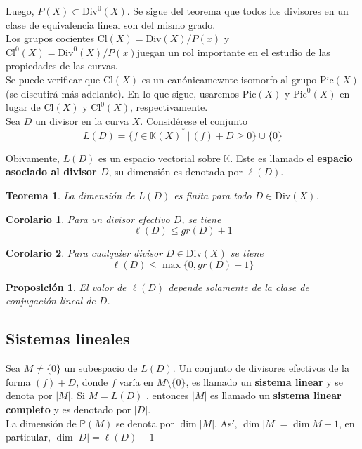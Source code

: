 \documentclass[12pt,a4paper]{report}
\newcommand{\K}{\mathbb{K}}
\newtheorem{teo}{Teorema}[chapter]
\newtheorem{cor}{Corolario}[chapter]
\newtheorem{prop}{Proposición}[chapter]
\begin{document}
Luego, $P(X) \subset \mbox{Div}^{0}(X)$. Se sigue del teorema que todos los divisores en un clase de equivalencia lineal son del mismo grado. \\
Los grupos cocientes $\mbox{Cl}(X)=\mbox{Div}(X)/P(x)$ y $\mbox{Cl}^{0}(X)=\mbox{Div}^{0}(X)/P(x) $juegan un rol importante en el estudio de las propiedades de las curvas. \\
Se puede verificar que $\mbox{Cl}(X)$ es un canónicamewnte isomorfo al grupo $\mbox{Pic}(X)$ (se discutirá más adelante). En lo que sigue, usaremos $ \mbox{Pic}(X) $ y $\mbox{Pic}^{0}(X)$ en lugar de $ \mbox{Cl}(X) $ y $\mbox{Cl}^{0}(X)$, respectivamente. \\
Sea $D$ un divisor en la curva $X$. Considérese el conjunto $$L(D)= \{ f \in \K(X)^{*} \, | \, (f) +D \geqslant 0 \} \cup \{0\} $$

Obivamente, $L(D)$ es un espacio vectorial sobre $\K$. Este es llamado el \textbf{espacio asociado al divisor $D$}, su dimensión es denotada por $ \ell (D) $.

\begin{teo}\label{2.1.53}
	La dimensión de $L(D)$ es finita para todo $D \in \mbox{Div}(X)$.
\end{teo}

\begin{cor}
	Para un divisor efectivo $D$, se tiene $$ \ell (D) \leq gr(D) +1 $$
\end{cor}

\begin{cor}
	Para cualquier divisor $D \in \mbox{Div}(X)$ se tiene $$ \ell(D) \leq \max \{ 0, gr (D)+1 \} $$
\end{cor}

\begin{prop}
	El valor de $\ell(D)$ depende solamente de la clase de conjugación lineal de $D$.
\end{prop}

\subsection{Sistemas lineales}
Sea $M \neq \{0\}$ un subespacio de $L(D)$. Un conjunto de divisores efectivos de la forma $(f) + D$, donde $f$ varía en $M \setminus \{0\}$, es llamado un \textbf{sistema linear} y se denota por $|M|$. Si $M=L(D)$ , entonces $|M|$ es llamado un \textbf{sistema linear completo} y es denotado por $|D|$.\\

La dimensión de $\mathbb{P}(M)$ se denota por $\dim |M|$. Así, $\dim |M| =\dim M -1 $, en particular, $\dim |D|= \ell(D)-1$\\
\end{document}
